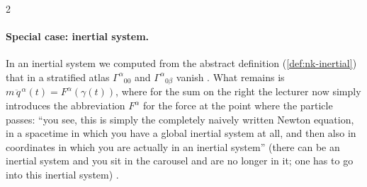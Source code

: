 \begin{paracol}{2}
\paragraph{Special case: inertial system.} In an inertial system we computed from the abstract definition (\cref{def:nk-inertial}) that in a stratified atlas $\Gamma^\alpha{}_{00}$ and $\Gamma^\alpha{}_{0\beta}$ vanish . What remains is
$m\,\ddot q^{\,\alpha}(t)=F^\alpha(\gamma(t))$, where for the sum on the right the lecturer now simply introduces the abbreviation $F^\alpha$ for the force at the point where the particle passes: ``you see, this is simply the completely naively written Newton equation, in a spacetime in which you have a global
inertial system at all, and then also in coordinates in which you are actually in an inertial system'' (there can be an inertial system and you sit in the carousel and are no longer in it; one has to go into this inertial system) .


\end{paracol}
